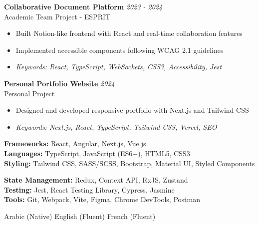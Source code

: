 \documentclass[11pt,a4paper]{article}
\begin{document}

\textbf{Collaborative Document Platform} \hfill \textit{2023 - 2024}\\[-2pt]
Academic Team Project - ESPRIT\\[-5pt]
\begin{itemize}[leftmargin=8pt,itemsep=1pt,topsep=2pt]
  \item Built Notion-like frontend with React and real-time collaboration features
  \item Implemented accessible components following WCAG 2.1 guidelines
  \item[] \textit{\footnotesize Keywords: React, TypeScript, WebSockets, CSS3, Accessibility, Jest}
\end{itemize}\vspace{3pt}

\textbf{Personal Portfolio Website} \hfill \textit{2024}\\[-2pt]
Personal Project\\[-5pt]
\begin{itemize}[leftmargin=8pt,itemsep=1pt,topsep=2pt]
  \item Designed and developed responsive portfolio with Next.js and Tailwind CSS
  \item[] \textit{\footnotesize Keywords: Next.js, React, TypeScript, Tailwind CSS, Vercel, SEO}
\end{itemize}\vspace{3pt}

{\small
\begin{minipage}[t]{0.48\textwidth}
  \textbf{Frameworks:} React, Angular, Next.js, Vue.js\\[1.5pt]
  \textbf{Languages:} TypeScript, JavaScript (ES6+), HTML5, CSS3\\[1.5pt]
  \textbf{Styling:} Tailwind CSS, SASS/SCSS, Bootstrap, Material UI, Styled Components
\end{minipage}
\hfill
\begin{minipage}[t]{0.48\textwidth}
  \textbf{State Management:} Redux, Context API, RxJS, Zustand\\[1.5pt]
  \textbf{Testing:} Jest, React Testing Library, Cypress, Jasmine\\[1.5pt]
  \textbf{Tools:} Git, Webpack, Vite, Figma, Chrome DevTools, Postman
\end{minipage}
}

Arabic (Native) \textbar{} English (Fluent) \textbar{} French (Fluent)
\end{document}
